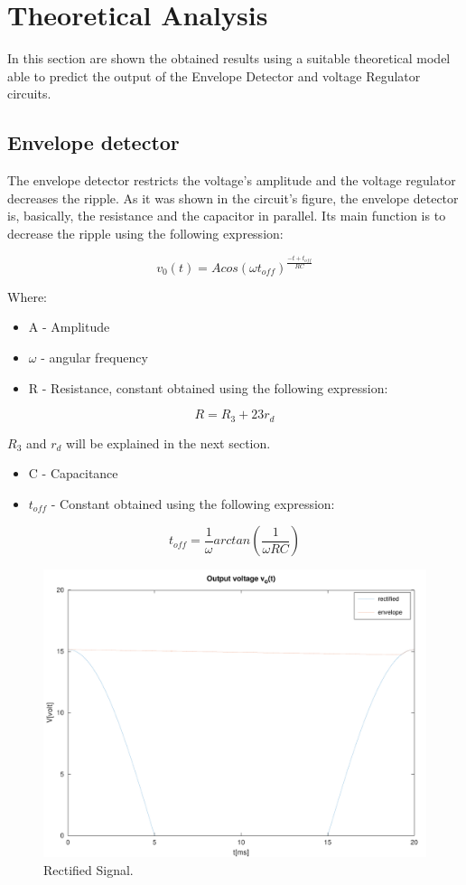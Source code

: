 \section{Theoretical Analysis}
\label{sec:analysis}

In this section are shown the obtained results using a suitable theoretical model able to predict the output of the Envelope Detector and voltage Regulator circuits.

\subsection{Envelope detector}
The envelope detector restricts the voltage's amplitude and the voltage regulator decreases the ripple. As it was shown in the circuit's figure, the envelope detector is, basically, the resistance and the capacitor in parallel. Its main function is to decrease the ripple using the following expression:\par
\begin{equation}
    v_0(t) = Acos(\omega t_{off})^{\frac{-t+t_{off}}{RC}}
\end{equation}\par
Where: \par
\begin{itemize}
  \item A - Amplitude
  \item $\omega$ - angular frequency
  \item R - Resistance, constant obtained using the following expression:
\end{itemize}
\begin{equation}
    R = R_3 + 23r_d 
\end{equation}\par
$R_3$ and $r_d$ will be explained in the next section.\par
\begin{itemize}
  \item C - Capacitance
  \item $t_{off}$ - Constant obtained using the following expression:
\end{itemize}
\begin{equation}
    t_{off}=\frac{1}{\omega}arctan(\frac{1}{\omega RC})
\end{equation}\par

\begin{figure}[H] \centering
\includegraphics[width=0.7\linewidth]{../mat/retified.pdf}
\caption{Rectified Signal.}
\label{fig:rectified}
\end{figure}

